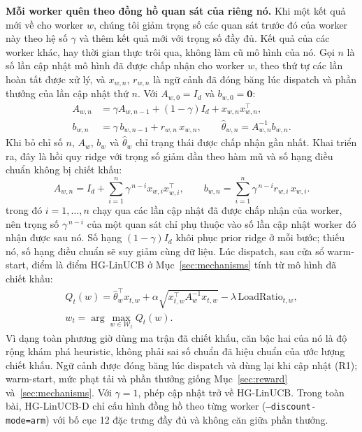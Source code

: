 \documentclass[final,5p,times,twocolumn]{elsarticle}
\begin{document}
\textbf{Mỗi worker quên theo đồng hồ quan sát của riêng nó.} Khi một kết quả mới về cho worker $w$, chúng tôi giảm trọng số các quan sát trước đó của worker này theo hệ số $\gamma$ và thêm kết quả mới với trọng số đầy đủ. Kết quả của các worker khác, hay thời gian thực trôi qua, không làm cũ mô hình của nó. Gọi $n$ là số lần cập nhật mô hình đã được chấp nhận cho worker $w$, theo thứ tự các lần hoàn tất được xử lý, và $x_{w,n}$, $r_{w,n}$ là ngữ cảnh đã đóng băng lúc dispatch và phần thưởng của lần cập nhật thứ $n$. Với $A_{w,0}=I_d$ và $b_{w,0}=\mathbf{0}$:
\begin{align}
A_{w,n}&=\gamma A_{w,n-1}+(1-\gamma)I_d+x_{w,n}x_{w,n}^\top,\\
b_{w,n}&=\gamma\,b_{w,n-1}+r_{w,n}\,x_{w,n},\qquad \hat\theta_{w,n}=A_{w,n}^{-1}b_{w,n}.
\end{align}
Khi bỏ chỉ số $n$, $A_w$, $b_w$ và $\hat\theta_w$ chỉ trạng thái được chấp nhận gần nhất. Khai triển ra, đây là hồi quy ridge với trọng số giảm dần theo hàm mũ và số hạng điều chuẩn không bị chiết khấu:
\begin{equation}
A_{w,n}=I_d+\sum_{i=1}^{n}\gamma^{\,n-i}x_{w,i}x_{w,i}^\top,\qquad b_{w,n}=\sum_{i=1}^{n}\gamma^{\,n-i}r_{w,i}\,x_{w,i}.
\end{equation}
trong đó $i=1,\dots,n$ chạy qua các lần cập nhật đã được chấp nhận của worker, nên trọng số $\gamma^{\,n-i}$ của một quan sát chỉ phụ thuộc vào số lần cập nhật worker đó nhận được sau nó. Số hạng $(1-\gamma)I_d$ khôi phục prior ridge ở mỗi bước; thiếu nó, số hạng điều chuẩn sẽ suy giảm cùng dữ liệu. Lúc dispatch, sau cửa sổ warm-start, điểm là điểm HG-LinUCB ở Mục~\ref{sec:mechanisms} tính từ mô hình đã chiết khấu:
\begin{equation}
\begin{gathered}
Q_t(w)=\hat\theta_w^\top x_{t,w}+\alpha\sqrt{x_{t,w}^\top A_w^{-1}x_{t,w}}-\lambda\,\text{LoadRatio}_{t,w},\\
w_t=\arg\max_{w\in\mathcal{W}_t}Q_t(w).
\end{gathered}
\end{equation}
Vì dạng toàn phương giờ dùng ma trận đã chiết khấu, căn bậc hai của nó là độ rộng khám phá heuristic, không phải sai số chuẩn đã hiệu chuẩn của ước lượng chiết khấu. Ngữ cảnh được đóng băng lúc dispatch và dùng lại khi cập nhật (R1); warm-start, mức phạt tải và phần thưởng giống Mục~\ref{sec:reward} và~\ref{sec:mechanisms}. Với $\gamma=1$, phép cập nhật trở về HG-LinUCB. Trong toàn bài, HG-LinUCB-D chỉ cấu hình đồng hồ theo từng worker (\texttt{--discount-mode=arm}) với bố cục 12 đặc trưng đầy đủ và không căn giữa phần thưởng.
\end{document}
